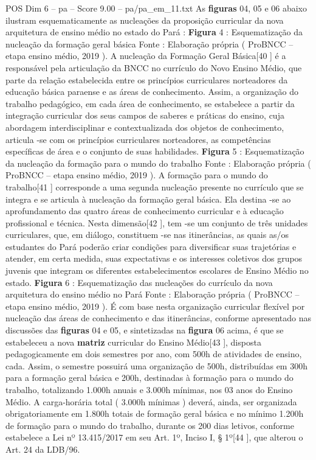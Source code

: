 \begin{textsample}{POS Dim 6 – pa – Score 9.00 – pa/pa\_em\_11.txt}
As \textbf{figuras} 04, 05 e 06 abaixo ilustram esquematicamente as nucleações da proposição curricular da nova arquitetura de ensino médio no estado do Pará : \textbf{Figura} 4 : Esquematização da nucleação da formação geral básica Fonte : Elaboração própria ( ProBNCC – etapa ensino médio, 2019 ).
A nucleação da Formação Geral Básica[40 ] é a responsável pela articulação da BNCC no currículo do Novo Ensino Médio, que parte da relação estabelecida entre os princípios curriculares norteadores da educação básica paraense e as áreas de conhecimento.
Assim, a organização do trabalho pedagógico, em cada área de conhecimento, se estabelece a partir da integração curricular dos seus campos de saberes e práticas do ensino, cuja abordagem interdisciplinar e contextualizada dos objetos de conhecimento, articula -se com os princípios curriculares norteadores, as competências específicas de área e o conjunto de suas habilidades. \textbf{Figura} 5 : Esquematização da nucleação da formação para o mundo do trabalho Fonte : Elaboração própria ( ProBNCC – etapa ensino médio, 2019 ).
A formação para o mundo do trabalho[41 ] corresponde a uma segunda nucleação presente no currículo que se integra e se articula à nucleação da formação geral básica.
Ela destina -se ao aprofundamento das quatro áreas de conhecimento curricular e à educação profissional e técnica.
Nesta dimensão[42 ], tem -se um conjunto de três unidades curriculares, que, em diálogo, constituem -se nas itinerâncias, as quais as/os estudantes do Pará poderão criar condições para diversificar suas trajetórias e atender, em certa medida, suas expectativas e os interesses coletivos dos grupos juvenis que integram os diferentes estabelecimentos escolares de Ensino Médio no estado. \textbf{Figura} 6 : Esquematização das nucleações do currículo da nova arquitetura do ensino médio no Pará Fonte : Elaboração própria ( ProBNCC – etapa ensino médio, 2019 ).
É com base nesta organização curricular flexível por nucleação das áreas de conhecimento e das itinerâncias, conforme apresentado nas discussões das \textbf{figuras} 04 e 05, e sintetizadas na \textbf{figura} 06 acima, é que se estabeleceu a nova \textbf{matriz} curricular do Ensino Médio[43 ], disposta pedagogicamente em dois semestres por ano, com 500h de atividades de ensino, cada.
Assim, o semestre possuirá uma organização de 500h, distribuídas em 300h para a formação geral básica e 200h, destinadas à formação para o mundo do trabalho, totalizando 1.000h anuais e 3.000h mínimas, nos 03 anos do Ensino Médio.
A carga-horária total ( 3.000h mínimas ) deverá, ainda, ser organizada obrigatoriamente em 1.800h totais de formação geral básica e no mínimo 1.200h de formação para o mundo do trabalho, durante os 200 dias letivos, conforme estabelece a Lei nº 13.415/2017 em seu Art. 1º, Inciso I, § 1º[44 ], que alterou o Art. 24 da LDB/96.

\end{textsample}

